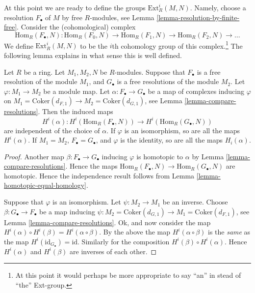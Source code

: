 \noindent
At this point we are ready to define the groups
$\text{Ext}^i_R(M, N)$. Namely, choose a resolution
$F_{\bullet}$ of $M$ by free $R$-modules, see Lemma
\ref{lemma-resolution-by-finite-free}. Consider
the (cohomological) complex
$$
\text{Hom}_R(F_\bullet, N) :
\text{Hom}_R(F_0, N) \to
\text{Hom}_R(F_1, N) \to
\text{Hom}_R(F_2, N) \to \ldots
$$
We define $\text{Ext}^i_R(M, N)$ to be the $i$th
cohomology group of this complex.\footnote{At this point
it would perhaps be more appropriate to say ``an'' in stead
of ``the'' Ext-group.} The following lemma explains
in what sense this is well defined.

\begin{lemma}
\label{lemma-ext-welldefined}
Let $R$ be a ring. Let $M_1, M_2, N$ be $R$-modules.
Suppose that $F_{\bullet}$ is a free resolution of the module $M_1$,
and $G_{\bullet}$ is a free resolutions of the module $M_2$.
Let $\varphi : M_1 \to M_2$ be a module map.
Let $\alpha : F_{\bullet} \to G_{\bullet}$ be
a map of complexes inducing $\varphi$ on
$M_1 = \text{Coker}(d_{F, 1}) \to M_2 = \text{Coker}(d_{G, 1})$,
see Lemma \ref{lemma-compare-resolutions}.
Then the induced maps
$$
H^i(\alpha) :
H^i(\text{Hom}_R(F_{\bullet}, N))
\longrightarrow
H^i(\text{Hom}_R(G_{\bullet}, N))
$$
are independent of the choice of $\alpha$.
If $\varphi$ is an isomorphism, so are all the maps
$H^i(\alpha)$. If $M_1 = M_2$, $F_\bullet = G_\bullet$, and
$\varphi$ is the identity, so are all the maps $H_i(\alpha)$.
\end{lemma}

\begin{proof}
Another map $\beta : F_{\bullet} \to G_{\bullet}$
inducing $\varphi$ is homotopic to $\alpha$ by
Lemma \ref{lemma-compare-resolutions}. Hence the
maps $\text{Hom}_R(F_\bullet, N) \to
\text{Hom}_R(G_\bullet, N)$ are homotopic.
Hence the independence result follows from
Lemma \ref{lemma-homotopic-equal-homology}.

\medskip\noindent
Suppose that $\varphi$ is an isomorphism.
Let $\psi : M_2 \to M_1$ be an inverse.
Choose $\beta : G_{\bullet} \to F_{\bullet}$
be a map inducing $\psi :
M_2 = \text{Coker}(d_{G, 1}) \to M_1 = \text{Coker}(d_{F, 1})$,
see Lemma \ref{lemma-compare-resolutions}.
Ok, and now consider the map
$H^i(\alpha) \circ H^i(\beta) =
H^i(\alpha \circ \beta)$. By the above the
map $H^i(\alpha \circ \beta)$ is the {\it same}
as the map $H^i(\text{id}_{G_{\bullet}}) = \text{id}$.
Similarly for the composition $H^i(\beta) \circ H^i(\alpha)$.
Hence $H^i(\alpha)$ and $H^i(\beta)$ are inverses of each other.
\end{proof}

